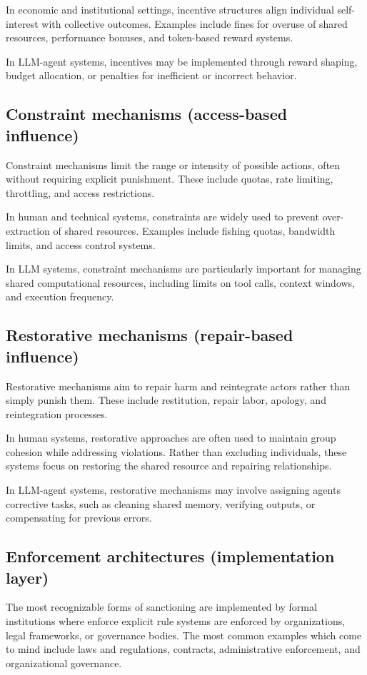 {In economic and institutional settings, incentive structures align individual self-interest with collective outcomes. Examples include fines for overuse of shared resources, performance bonuses, and token-based reward systems.

In LLM-agent systems, incentives may be implemented through reward shaping, budget allocation, or penalties for inefficient or incorrect behavior.

\subsection{Constraint mechanisms (access-based influence)}
Constraint mechanisms limit the range or intensity of possible actions, often without requiring explicit punishment. These include quotas, rate limiting, throttling, and access restrictions.

In human and technical systems, constraints are widely used to prevent over-extraction of shared resources. Examples include fishing quotas, bandwidth limits, and access control systems.

In LLM systems, constraint mechanisms are particularly important for managing shared computational resources, including limits on tool calls, context windows, and execution frequency.

\subsection{Restorative mechanisms (repair-based influence)}
Restorative mechanisms aim to repair harm and reintegrate actors rather than simply punish them. These include restitution, repair labor, apology, and reintegration processes.

In human systems, restorative approaches are often used to maintain group cohesion while addressing violations. Rather than excluding individuals, these systems focus on restoring the shared resource and repairing relationships.

In LLM-agent systems, restorative mechanisms may involve assigning agents corrective tasks, such as cleaning shared memory, verifying outputs, or compensating for previous errors.

\subsection{Enforcement architectures (implementation layer)}
The most recognizable forms of sanctioning are implemented by formal institutions where enforce explicit rule systems are enforced by organizations, legal frameworks, or governance bodies. The most common examples which come to mind include laws and regulations, contracts, administrative enforcement, and organizational governance.

}
